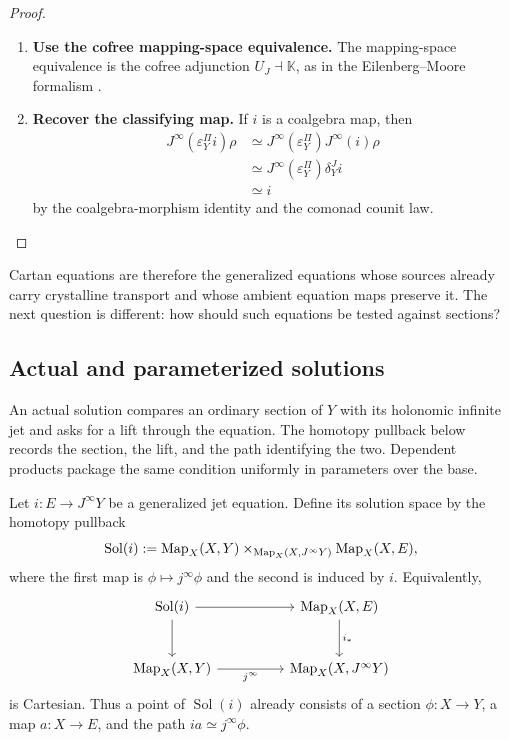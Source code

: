 \begin{proof}
\leavevmode
\begin{enumerate}[label=\textup{(\arabic*)}]
    \item \textbf{Use the cofree mapping-space equivalence.}
The mapping-space equivalence is the cofree adjunction
\(U_J\dashv\mathbb K\), as in the Eilenberg--Moore formalism
\cite{LurieHigherAlgebra}.

    \item \textbf{Recover the classifying map.}
If \(i\) is a
coalgebra map, then
\[
\begin{aligned}
  J^\infty(\varepsilon^\Pi_Yi)\rho
  &\simeq
  J^\infty(\varepsilon^\Pi_Y)J^\infty(i)\rho\\
  &\simeq
  J^\infty(\varepsilon^\Pi_Y)\delta^J_Yi\\
  &\simeq i
\end{aligned}
\]
by the coalgebra-morphism identity and the comonad counit law.
\end{enumerate}
\end{proof}

Cartan equations are therefore the generalized equations whose sources already
carry crystalline transport and whose ambient equation maps preserve it. The
next question is different: how should such equations be tested against
sections?

\subsection{Actual and parameterized solutions}
\label{sec:actual-solutions}

An actual solution compares an ordinary section of \(Y\) with its holonomic
infinite jet and asks for a lift through the equation. The homotopy pullback
below records the section, the lift, and the path identifying the two. Dependent
products package the same condition uniformly in parameters over the base.
\begin{definition}
Let \(i:E\to J^\infty Y\) be a generalized jet equation. Define its solution
space by the homotopy pullback
\[
  \operatorname{Sol}(i)
  :=
  \operatorname{Map}_X(X,Y)
  \times_{\operatorname{Map}_X(X,J^\infty Y)}
  \operatorname{Map}_X(X,E),
\]
where the first map is \(\phi\mapsto j^\infty\phi\) and the second is induced
by \(i\). Equivalently,
\[
\begin{tikzcd}[column sep=huge,row sep=large]
\operatorname{Sol}(i)
  \ar[r]
  \ar[d]
&
\Map_X(X,E) \ar[d,"i_*"]\\
\Map_X(X,Y)
  \ar[r,"j^\infty"']
&
\Map_X(X,J^\infty Y)
\end{tikzcd}
\]
is Cartesian. Thus a point of \(\operatorname{Sol}(i)\) already consists of a section
\(\phi:X\to Y\), a map \(a:X\to E\), and the path
\(ia\simeq j^\infty\phi\).
\end{definition}

